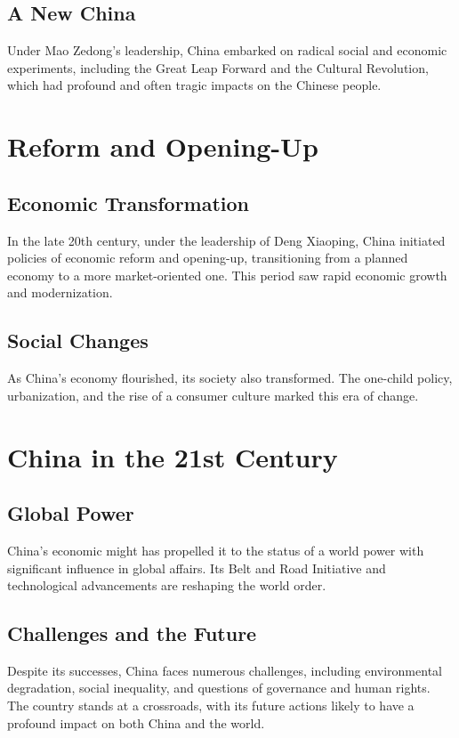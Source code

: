 \documentclass[a4paper,12pt]{book}
\begin{document}
\subsection{A New China}
Under Mao Zedong's leadership, China embarked on radical social and economic experiments, including the Great Leap Forward and the Cultural Revolution, which had profound and often tragic impacts on the Chinese people.

\section{Reform and Opening-Up}
\label{sec:reform-opening-up}
\subsection{Economic Transformation}
In the late 20th century, under the leadership of Deng Xiaoping, China initiated policies of economic reform and opening-up, transitioning from a planned economy to a more market-oriented one. This period saw rapid economic growth and modernization.

\subsection{Social Changes}
As China's economy flourished, its society also transformed. The one-child policy, urbanization, and the rise of a consumer culture marked this era of change.

\section{China in the 21st Century}
\label{sec:china-21st-century}
\subsection{Global Power}
China's economic might has propelled it to the status of a world power with significant influence in global affairs. Its Belt and Road Initiative and technological advancements are reshaping the world order.

\subsection{Challenges and the Future}
Despite its successes, China faces numerous challenges, including environmental degradation, social inequality, and questions of governance and human rights. The country stands at a crossroads, with its future actions likely to have a profound impact on both China and the world.
\end{document}
